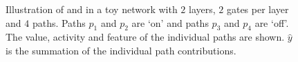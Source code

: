 \begin{figure}[t]
\centering
{}
\caption{Illustration of  and  in a  toy network with $2$ layers, $2$ gates per layer and $4$ paths. Paths $p_1$ and $p_2$ are `on' and paths $p_3$ and $p_4$ are `off'. The value, activity and feature of the individual paths are shown. $\hat{y}$ is the summation of the individual path contributions.}
\label{fig:paths}
\end{figure}

